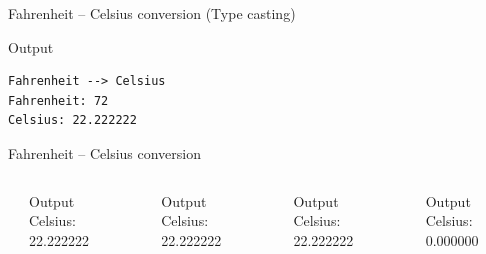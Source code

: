 \documentclass[usenames,dvipsnames,aspectratio=169]{beamer}
\begin{document}
\begin{frame}[fragile]{Fahrenheit -- Celsius conversion}
   (Type casting)
  \begin{exampleblock}{}
    
  \end{exampleblock}
  \begin{block}{Output}
    \begin{verbatim}
Fahrenheit --> Celsius
Fahrenheit: 72
Celsius: 22.222222
\end{verbatim}
  \end{block}
\end{frame}

\begin{frame}{Fahrenheit -- Celsius conversion}
  \begin{columns}[T]
      \begin{exampleblock}{}
        \tiny
        
      \end{exampleblock}
      \begin{block}{Output}
        \scriptsize
        Celsius: 22.222222\\
      \end{block}
      \begin{exampleblock}{}
        \tiny
        
      \end{exampleblock}
      \begin{block}{Output}
        \scriptsize
        Celsius: 22.222222\\
      \end{block}
      \begin{exampleblock}{}
        \tiny
        
      \end{exampleblock}
      \begin{block}{Output}
        \scriptsize
        Celsius: 22.222222\\
      \end{block}
      \begin{exampleblock}{}
        \tiny
        
      \end{exampleblock}
      \begin{block}{Output}
        \scriptsize
        Celsius: 0.000000\\
      \end{block}
  \end{columns}
\end{frame}
\end{document}
